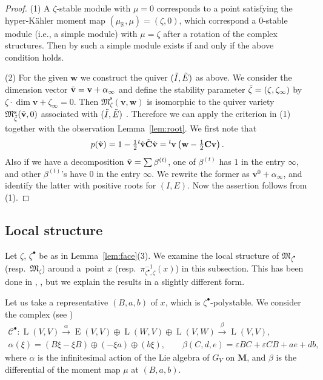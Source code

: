 \documentclass[10pt,a4paper]{amsart}
\theoremstyle{definition}
\numberwithin{equation}{section}
\newcommand{\lemref}[1]{Lemma~\ref{#1}}
\newcommand{\lsp}[2]{{\mskip-.3mu}{}^{#1}\mskip-1mu{#2}}
\newcommand{\R}{{\mathbb R}}
\newcommand{\bM}{{\mathbf M}} %
\newcommand{\M}{{\mathfrak M}} %
\newcommand{\Mreg}{\M^{\operatorname{s}}}
\newcommand{\bv}{{\mathbf v}} %
\newcommand{\bw}{{\mathbf w}} %
\newcommand{\bC}{{\mathbf C}} %
\newcommand{\HomE}{\operatorname{E}}
\newcommand{\HomL}{\operatorname{L}}
\begin{document}
\begin{proof}
(1) A $\zeta$-stable module with $\mu = 0$ corresponds to a point
satisfying the hyper-K\"ahler moment map $(\mu_\R,\mu) = (\zeta,0)$,
which correspond a $0$-stable module (i.e., a simple module) with $\mu
= \zeta$ after a rotation of the complex structures. Then by
\cite[Theorem~1.2]{CB} such a simple module exists if and only if the
above condition holds.

(2) For the given $\bw$ we construct the quiver $(\Tilde{I},\Tilde{E})$ as
above. We consider the dimension vector $\Tilde{\bv} = \bv + \alpha_\infty$
and def\/ine the stability parameter $\Tilde{\zeta} = (\zeta,\zeta_\infty)$ by
\(
\zeta\cdot \dim \bv + \zeta_\infty = 0.
\)
Then $\Mreg_\zeta(\bv,\bw)$ is isomorphic to the quiver variety
$\Mreg_{\Tilde{\zeta}}(\Tilde{\bv},0)$ associated with
$(\Tilde{I},\Tilde{E})$ \cite[the end of Introduction]{CB}.
%
Therefore we can apply the criterion in (1) together with the
observation \lemref{lem:root}. We f\/irst note that
\[
  p(\Tilde{\bv}) = 1 - \tfrac12 \lsp{t}{\Tilde{\bv}} \Tilde{\bC} \Tilde{\bv}
  = \lsp{t}{\bv}\left(\bw - \tfrac12 \bC \bv\right).
\]
Also if we have a decomposition $\Tilde{\bv} = \sum \beta^{(t)}$, one
of $\beta^{(t)}$ has $1$ in the entry $\infty$, and other
$\beta^{(t)}$'s have $0$ in the entry $\infty$. We rewrite the former
as $\bv^0 + \alpha_\infty$, and identify the latter with positive
roots for $(I,E)$. Now the assertion follows from (1).
\end{proof}

\subsection{Local structure}\label{subsec:local}

Let $\zeta$, $\zeta^\bullet$ be as in \lemref{lem:face}(3).
%
We examine the local structure of $\M_{\zeta^\bullet}$ (resp.\ $\M_{\zeta}$)
around a~point $x$ (resp.\ $\pi_{\zeta^\bullet,\zeta}^{-1}(x)$) in this
subsection. This has been done in \cite[Section~6]{Na-quiver},
\cite[Section~3.2]{Na-qaff}, but we explain the results in a slightly
dif\/ferent form.

Let us take a representative $(B,a,b)$ of $x$, which is
$\zeta^\bullet$-polystable. We consider the complex (see
\cite[(3.11)]{Na-alg})
\begin{gather}
   \mathscr{C}^\bullet :
   \HomL(V,V) \xrightarrow{\alpha}
   \HomE(V,V)\oplus\HomL(W,V) \oplus \HomL(V,W) \xrightarrow{\beta}
   \HomL(V,V),
\nonumber\\
   \alpha(\xi) = (B\xi-\xi B)\oplus (-\xi a) \oplus (b\xi), \qquad
   \beta(C,d,e) = \varepsilon B C + \varepsilon C B + a e + d b,\label{eq:tancpx}
\end{gather}
where $\alpha$ is the inf\/initesimal action of the Lie algebra of $G_V$
on $\bM$, and $\beta$ is the dif\/ferential of the moment map $\mu$ at
$(B,a,b)$.
\end{document}
